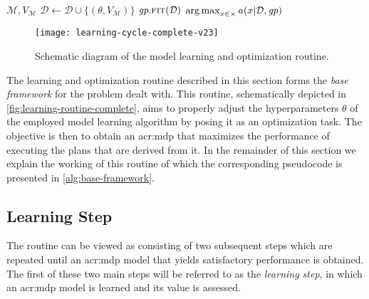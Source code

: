 \begin{algorithm}[t!]
\begin{algorithmic}[1]
			\State\Return $\mathcal{M}, V_\mathcal{M}$
		\EndFunction
		\Statex
			\State $\mathcal{D} \gets \mathcal{D} \cup \{(\theta, V_\mathcal{M})\}$
			\State $\mathit{gp}.\textproc{fit}(\mathcal{D})$	
			\State\Return $\operatorname*{arg\,max}_{x \in \mathcal{\Theta}} a(x \vert \mathcal{D}, \mathit{gp})$	
		\EndFunction
	\end{algorithmic}
\end{algorithm}

\begin{figure}[t]
	\centering
	\texttt{[image: learning-cycle-complete-v23]}
	\caption{Schematic diagram of the model learning and optimization routine.}
	\label{fig:learning-routine-complete}
\end{figure}

The learning and optimization routine described in this section forms the \textit{base framework} for the problem dealt with.
This routine, schematically depicted in \autoref{fig:learning-routine-complete}, aims to properly adjust the hyperparameters $\theta$ of the employed model learning algorithm by posing it as an optimization task.
The objective is then to obtain an \acrshort{acr:mdp} that maximizes the performance of executing the plans that are derived from it.
In the remainder of this section we explain the working of this routine of which the corresponding pseudocode is presented in \autoref{alg:base-framework}.


\subsection{Learning Step}
\label{sec:learning-step}

The routine can be viewed as consisting of two subsequent steps which are repeated until an \acrshort{acr:mdp} model that yields satisfactory performance is obtained.
The first of these two main steps will be referred to as the \textit{learning step}, in which an \acrshort{acr:mdp} model is learned and its value is assessed.

